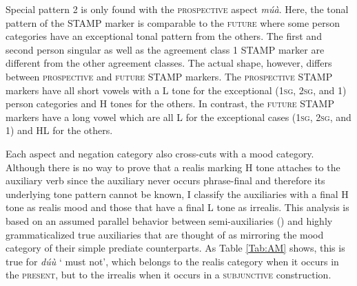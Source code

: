 Special pattern 2 is only found with the \textsc{prospective} aspect {\itshape múà}. Here, the tonal pattern of the STAMP marker is comparable to the \textsc{future} where some person categories have an exceptional tonal pattern from the others. The first and second person singular as well as the agreement class 1 STAMP marker are different from the other agreement classes. The actual shape, however, differs between \textsc{prospective} and \textsc{future} STAMP markers. The \textsc{prospective} STAMP markers have all short vowels with a L tone for the exceptional (1\textsc{sg}, 2\textsc{sg}, and 1) person categories and H tones for the others. In contrast, the \textsc{future} STAMP markers have a long vowel which are all L for the exceptional cases (1\textsc{sg}, 2\textsc{sg}, and 1) and HL for the others.


Each aspect and negation category also cross-cuts with a mood category. Although there is no way to prove that a realis marking H tone attaches to the auxiliary verb since the auxiliary never occurs phrase-final and therefore its underlying tone pattern cannot be known, I classify the auxiliaries with a final H tone as realis mood and those that have a final L tone as irrealis. This analysis is based on an assumed parallel behavior between semi-auxiliaries () and highly grammaticalized true auxiliaries that are thought of as mirroring the mood category of their simple prediate counterparts.  As Table \ref{Tab:AM} shows, this is true for {\itshape dúù} ` must not', which belongs to the realis category when it occurs in the \textsc{present}, but to the irrealis when it occurs in a \textsc{subjunctive} construction.


